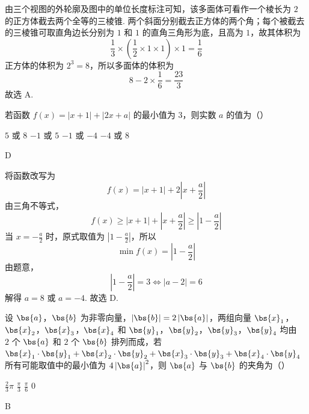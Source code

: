 \begin{solution}
由三个视图的外轮廓及图中的单位长度标注可知，该多面体可看作一个棱长为 \(2\) 的正方体截去两个全等的三棱锥. 两个斜面分别截去正方体的两个角；每个被截去的三棱锥可取直角边长分别为 \(1\) 和 \(1\) 的直角三角形为底，且高为 \(1\)，故其体积为
\[
\frac13\times\left(\frac12\times1\times1\right)\times1=\frac16
\]
正方体的体积为 \(2^3=8\)，所以多面体的体积为
\[
8-2\times\frac16=\frac{23}{3}
\]
故选 A.
\end{solution}

\begin{problem}
若函数 \(f(x) = |x + 1| + |2x + a|\) 的最小值为 \(3\)，则实数 \(a\) 的值为（\quad）

\choices
    {\(5\) 或 \(8\)}
    {\(-1\) 或 \(5\)}
    {\(-1\) 或 \(-4\)}
    {\(-4\) 或 \(8\)}

\begin{answer}
D
\end{answer}
\end{problem}

\begin{solution}
将函数改写为
\[
f(x)=|x+1|+2\left|x+\frac{a}{2}\right|
\]
由三角不等式，
\[
f(x)\geqslant\left|x+1\right|+\left|x+\frac{a}{2}\right|\geqslant\left|1-\frac{a}{2}\right|
\]
当 \(x=-\frac{a}{2}\) 时，原式取值为 \(\left|1-\frac{a}{2}\right|\)，所以
\[
\min f(x)=\left|1-\frac{a}{2}\right|
\]
由题意，
\[
\left|1-\frac{a}{2}\right|=3\Longleftrightarrow|a-2|=6
\]
解得 \(a=8\) 或 \(a=-4\).
故选 D.
\end{solution}

\begin{problem}
设 \(\bs{a}\)，\(\bs{b}\) 为非零向量，\(\left|\bs{b}\right| = 2\left|\bs{a}\right|\)，两组向量 \(\bs{x}_1\)，\(\bs{x}_2\)，\(\bs{x}_3\)，\(\bs{x}_4\) 和 \(\bs{y}_1\)，\(\bs{y}_2\)，\(\bs{y}_3\)，\(\bs{y}_4\) 均由 \(2\text{ 个}\) \(\bs{a}\) 和 \(2\text{ 个}\) \(\bs{b}\) 排列而成，若 \(\bs{x}_1 \cdot \bs{y}_1 + \bs{x}_2 \cdot \bs{y}_2 + \bs{x}_3 \cdot \bs{y}_3 + \bs{x}_4 \cdot \bs{y}_4\) 所有可能取值中的最小值为 \(4\left|\bs{a}\right|^2\)，则 \(\bs{a}\) 与 \(\bs{b}\) 的夹角为（\quad）

\choices
    {\(\frac{2}{3}\pi\)}
    {\(\frac{\pi}{3}\)}
    {\(\frac{\pi}{6}\)}
    {\(0\)}

\begin{answer}
B
\end{answer}
\end{problem}

